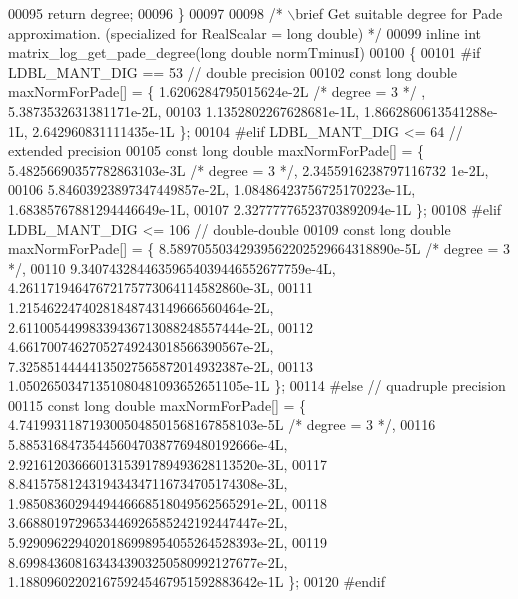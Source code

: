 \begin{DoxyCode}
00095   \textcolor{keywordflow}{return} degree;
00096 \}
00097 
00098 \textcolor{comment}{/* \(\backslash\)brief Get suitable degree for Pade approximation. (specialized for RealScalar = long double) */}
00099 \textcolor{keyword}{inline} \textcolor{keywordtype}{int} matrix\_log\_get\_pade\_degree(\textcolor{keywordtype}{long} \textcolor{keywordtype}{double} normTminusI)
00100 \{
00101 \textcolor{preprocessor}{#if   LDBL\_MANT\_DIG == 53         // double precision}
00102   \textcolor{keyword}{const} \textcolor{keywordtype}{long} \textcolor{keywordtype}{double} maxNormForPade[] = \{ 1.6206284795015624e-2L \textcolor{comment}{/* degree = 3 */} , 5.3873532631381171e-2L,
00103             1.1352802267628681e-1L, 1.8662860613541288e-1L, 2.642960831111435e-1L \};
00104 \textcolor{preprocessor}{#elif LDBL\_MANT\_DIG <= 64         // extended precision}
00105   \textcolor{keyword}{const} \textcolor{keywordtype}{long} \textcolor{keywordtype}{double} maxNormForPade[] = \{ 5.48256690357782863103e-3L \textcolor{comment}{/* degree = 3 */}, 2.3455916238797116732
      1e-2L,
00106             5.84603923897347449857e-2L, 1.08486423756725170223e-1L, 1.68385767881294446649e-1L,
00107             2.32777776523703892094e-1L \};
00108 \textcolor{preprocessor}{#elif LDBL\_MANT\_DIG <= 106        // double-double}
00109   \textcolor{keyword}{const} \textcolor{keywordtype}{long} \textcolor{keywordtype}{double} maxNormForPade[] = \{ 8.58970550342939562202529664318890e-5L \textcolor{comment}{/* degree = 3 */},
00110             9.34074328446359654039446552677759e-4L, 4.26117194647672175773064114582860e-3L,
00111             1.21546224740281848743149666560464e-2L, 2.61100544998339436713088248557444e-2L,
00112             4.66170074627052749243018566390567e-2L, 7.32585144444135027565872014932387e-2L,
00113             1.05026503471351080481093652651105e-1L \};
00114 \textcolor{preprocessor}{#else                             // quadruple precision}
00115   \textcolor{keyword}{const} \textcolor{keywordtype}{long} \textcolor{keywordtype}{double} maxNormForPade[] = \{ 4.7419931187193005048501568167858103e-5L \textcolor{comment}{/* degree = 3 */},
00116             5.8853168473544560470387769480192666e-4L, 2.9216120366601315391789493628113520e-3L,
00117             8.8415758124319434347116734705174308e-3L, 1.9850836029449446668518049562565291e-2L,
00118             3.6688019729653446926585242192447447e-2L, 5.9290962294020186998954055264528393e-2L,
00119             8.6998436081634343903250580992127677e-2L, 1.1880960220216759245467951592883642e-1L \};
00120 \textcolor{preprocessor}{#endif}

\end{DoxyCode}
